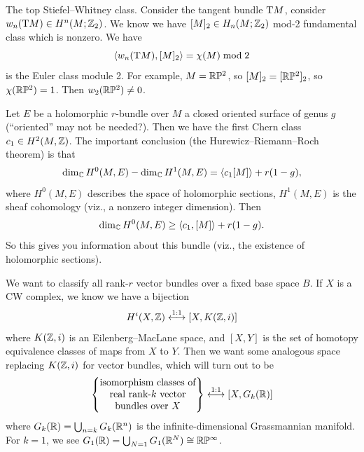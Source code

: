 \begin{example}
The top Stiefel--Whitney class. Consider the tangent bundle $\mathrm{T} M$,
consider $w_{n}(\mathrm{T} M)\in H^{n}(M;\mathbb{Z}_{2})$. We know we have
$[M]_{2}\in H_{n}(M;\mathbb{Z}_{2})$ mod-2 fundamental class which is
nonzero. We have
\begin{equation}
\langle w_{n}(\mathrm{T} M),[M]_{2}\rangle=\chi(M)\bmod{2}
\end{equation}
is the Euler class module 2. For example, $M=\mathbb{R}\mathbb{P}^{2}$, so
$[M]_{2}=[\mathbb{R}\mathbb{P}^{2}]_{2}$, so $\chi(\mathbb{R}\mathbb{P}^{2})=1$. Then $w_{2}(\mathbb{R}\mathbb{P}^{2})\neq0$.
\end{example}

\begin{example}
Let $E$ be a holomorphic $r$-bundle over $M$ a closed oriented surface
of genus $g$ (``oriented'' may not be needed?). Then we have the first
Chern class $c_{1}\in H^{2}(M,\mathbb{Z})$. The important conclusion (the
Hurewicz--Riemann--Roch theorem) is that
\begin{equation}
\dim_{\mathbb{C}}H^{0}(M,E)-\dim_{\mathbb{C}}H^{1}(M,E)=\langle c_{1}[M]\rangle+r(1-g),
\end{equation}
where $H^{0}(M,E)$ describes the space of holomorphic sections,
$H^{1}(M,E)$ is the sheaf cohomology (viz., a nonzero integer
dimension). Then
\begin{equation}
\dim_{\mathbb{C}}H^{0}(M,E)\geq\langle c_{1},[M]\rangle+r(1-g).
\end{equation}
So this gives you information about this bundle (viz., the existence
of holomorphic sections).
\end{example}

\begin{node}
We want to classify all rank-$r$ vector bundles over a fixed base
space $B$. If $X$ is a CW complex, we know we have a bijection
\begin{equation}
H^{i}(X,\mathbb{Z})\stackrel{1:1}{\longleftrightarrow}[X,K(\mathbb{Z},i)]
\end{equation}
where $K(\mathbb{Z},i)$ is an Eilenberg--MacLane space, and $[X,Y]$ is the
set of homotopy equivalence classes of maps from $X$ to $Y$. Then we
want some analogous space replacing $K(\mathbb{Z},i)$ for vector bundles,
which will turn out to be
\begin{equation}
\left\{\begin{matrix}
\mbox{isomorphism classes of}\\
\mbox{real rank-$k$ vector}\\
\mbox{bundles over $X$}\end{matrix}\right\}\stackrel{1:1}{\longleftrightarrow}[X,G_{k}(\mathbb{R})]
\end{equation}
where $G_{k}(\mathbb{R})=\bigcup_{n=k}G_{k}(\mathbb{R}^{n})$ is the
infinite-dimensional Grassmannian manifold. For $k=1$, we see
$G_{1}(\mathbb{R})=\bigcup_{N=1}G_{1}(\mathbb{R}^{N})\cong\mathbb{R}\mathbb{P}^{\infty}$.
\end{node}

